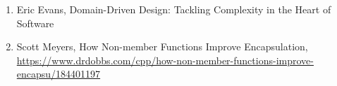\begin{enumerate}
\item Eric Evans, Domain-Driven Design: Tackling Complexity in the Heart of Software
\item Scott Meyers, How Non-member Functions Improve Encapsulation, \url{https://www.drdobbs.com/cpp/how-non-member-functions-improve-encapsu/184401197}
\end{enumerate}